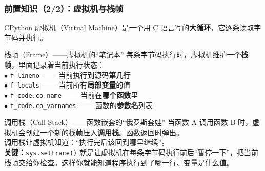 \documentclass[presentation,aspectratio=169,fontset=none]{ctexbeamer}
\begin{document}
\begin{frame}
\frametitle{前置知识（2/2）：虚拟机与栈帧}
{\footnotesize CPython 虚拟机（Virtual Machine）是一个用 C 语言写的\textbf{大循环}，它逐条读取字节码并执行。}

\vspace{0.1cm}
\begin{block}{\footnotesize 栈帧（Frame）——虚拟机的``笔记本''}
{\footnotesize 每条字节码执行时，虚拟机维护一个\textbf{栈帧}，里面记录着当前执行状态：\\[3pt]
\quad $\bullet$ \texttt{f\_lineno} —— 当前执行到源码\textbf{第几行}\\
\quad $\bullet$ \texttt{f\_locals} —— 当前所有\textbf{局部变量}的值\\
\quad $\bullet$ \texttt{f\_code.co\_name} —— 当前在\textbf{哪个函数}里\\
\quad $\bullet$ \texttt{f\_code.co\_varnames} —— 函数的\textbf{参数名}列表}
\end{block}

\vspace{0.1cm}
\begin{block}{\footnotesize 调用栈（Call Stack）——函数嵌套的``俄罗斯套娃''}
{\footnotesize 当函数 A 调用函数 B 时，虚拟机会创建一个新的栈帧压入\textbf{调用栈}。函数返回时弹出。\\[3pt]
调用栈让虚拟机知道：``执行完后该回到哪里继续''。\\[3pt]
\textbf{关键：}\texttt{sys.settrace()} 就是让虚拟机在每条字节码执行前后``暂停一下''，把当前栈帧交给你检查。这样你就能知道程序执行到了哪一行、变量是什么值。}
\end{block}
\end{frame}

\end{document}
